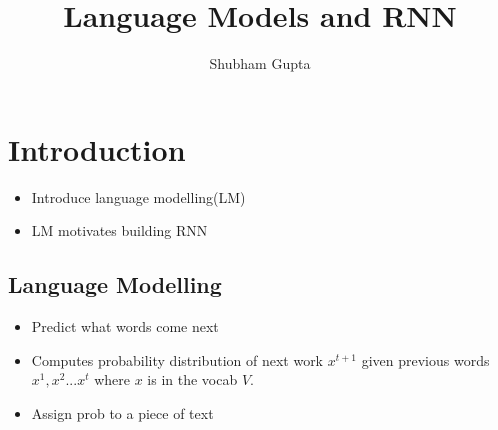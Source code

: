 \documentclass[a4paper]{article}
\title{Language Models and RNN}
\author{Shubham Gupta}
\begin{document}
\maketitle
\section{Introduction}
\begin{itemize}
    \item Introduce language modelling(LM)
    \item LM motivates building RNN
\end{itemize}
\subsection{Language Modelling}
\begin{itemize}
    \item Predict what words come next
    \item Computes probability distribution of next work $x^{t+1}$ given previous words $x^1,x^2...x^t$  where $x$ is in the vocab $V$.
    \item Assign prob to a piece of text
\end{itemize}
\end{document}
